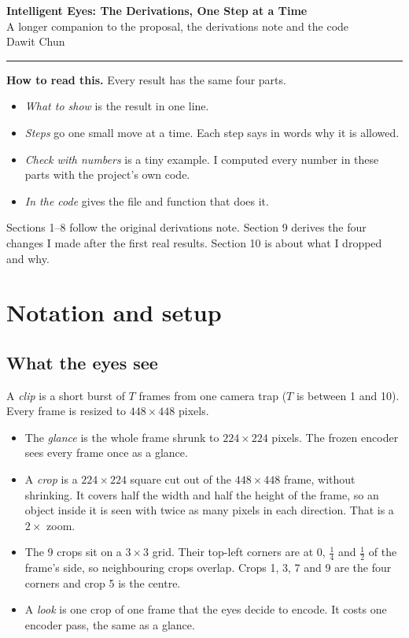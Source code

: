 \documentclass[11pt]{article}
\begin{document}
\sloppy

\begin{center}
{\sffamily\bfseries\LARGE Intelligent Eyes: The Derivations, One Step at a Time}\\[6pt]
{\sffamily\large A longer companion to the proposal, the derivations note and the code}\\[10pt]
Dawit Chun
\end{center}
\noindent\rule{\textwidth}{0.4pt}

\textbf{How to read this.} Every result has the same four parts.
\begin{itemize}
  \item \emph{What to show} is the result in one line.
  \item \emph{Steps} go one small move at a time. Each step says in words why it is allowed.
  \item \emph{Check with numbers} is a tiny example. I computed every number in these parts with the project's own code.
  \item \emph{In the code} gives the file and function that does it.
\end{itemize}
Sections 1--8 follow the original derivations note. Section 9 derives the four changes I made after the first real results. Section 10 is about what I dropped and why.

\tableofcontents

\section{Notation and setup}

\subsection{What the eyes see}

A \emph{clip} is a short burst of $T$ frames from one camera trap ($T$ is between 1 and 10). Every frame is resized to $448\times448$ pixels.
\begin{itemize}
  \item The \emph{glance} is the whole frame shrunk to $224\times224$ pixels. The frozen encoder sees every frame once as a glance.
  \item A \emph{crop} is a $224\times224$ square cut out of the $448\times448$ frame, without shrinking. It covers half the width and half the height of the frame, so an object inside it is seen with twice as many pixels in each direction. That is a $2\times$ zoom.
  \item The 9 crops sit on a $3\times3$ grid. Their top-left corners are at $0$, $\tfrac14$ and $\tfrac12$ of the frame's side, so neighbouring crops overlap. Crops 1, 3, 7 and 9 are the four corners and crop 5 is the centre.
  \item A \emph{look} is one crop of one frame that the eyes decide to encode. It costs one encoder pass, the same as a glance.
\end{itemize}
\end{document}

